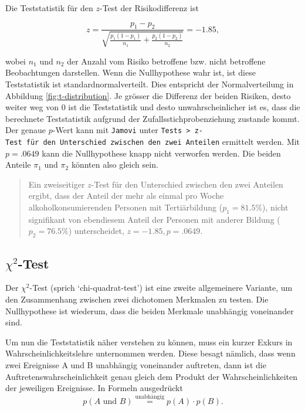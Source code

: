 \documentclass[
]{book}
\theoremstyle{definition}
\theoremstyle{definition}
\theoremstyle{definition}
\theoremstyle{definition}
\theoremstyle{remark}
\begin{document}
Die Teststatistik für den \(z\)-Test der Risikodifferenz ist

\[z = \frac{p_1-p_2}{\sqrt{\frac{p_1(1-p_1)}{n_1}+\frac{p_2(1-p_2)}{n_2}}} = -1.85,\]

wobei \(n_1\) und \(n_2\) der Anzahl vom Risiko betroffene bzw. nicht
betroffene Beobachtungen darstellen. Wenn die Nullhypothese wahr ist,
ist diese Teststatistik ist standardnormalverteilt. Dies entspricht der
Normalverteilung in Abbildung \ref{fig:t-distribution}. Je grösser die
Differenz der beiden Risiken, desto weiter weg von \(0\) ist die
Teststatistik und desto unwahrscheinlicher ist es, dass die berechnete
Teststatistik aufgrund der Zufallsstichprobenziehung zustande kommt. Der
genaue \(p\)-Wert kann mit \texttt{Jamovi} unter
\texttt{Tests\ \textgreater{}\ z-Test\ für\ den\ Unterschied\ zwischen\ den\ zwei\ Anteilen}
ermittelt werden. Mit \(p = .0649\) kann die Nullhypothese knapp nicht
verworfen werden. Die beiden Anteile \(\pi_1\) und \(\pi_2\) könnten also
gleich sein.

\begin{quote}
Ein zweiseitiger \(z\)-Test für den Unterschied zwischen den zwei
Anteilen ergibt, dass der Anteil der mehr als einmal pro Woche
alkoholkonsumierenden Personen mit Tertiärbildung (\(p_1 = 81.5\%\)),
nicht signifikant von ebendiesem Anteil der Personen mit anderer
Bildung (\(p_2 = 76.5\%\)) unterscheidet, \(z = -1.85, p = .0649\).
\end{quote}

\subsection{\texorpdfstring{\(\chi^2\)-Test}{\textbackslash chi\^{}2-Test}}\label{chi2-test}

\label{customdef-chisq-test}{Der \(\chi^2\)-Test (sprich `chi-quadrat-test') ist eine zweite
allgemeinere Variante, um den Zusammenhang zwischen zwei dichotomen
Merkmalen zu testen.}
Die Nullhypothese ist wiederum, dass die beiden Merkmale unabhängig
voneinander sind.

Um nun die Teststatistik näher verstehen zu können, muss ein kurzer
Exkurs in Wahrscheinlichkeitslehre unternommen werden. Diese besagt
nämlich, dass wenn zwei Ereignisse A und B unabhängig voneinander
auftreten, dann ist die Auftretenswahrscheinlichkeit genau gleich dem
Produkt der Wahrscheinlichkeiten der jeweiligen Ereignisse. In Formeln
ausgedrückt
\[p(A \text{ und }B) \overset{\text{unabhängig}}{=} p(A) \cdot p(B).\]
\end{document}
